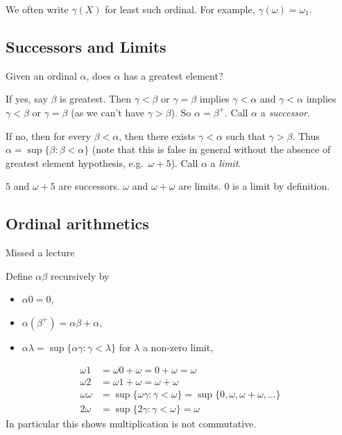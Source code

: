 \documentclass[a4paper]{article}
\begin{document}
\begin{notation}
  We often write \(\gamma(X)\) for least such ordinal. For example, \(\gamma(\omega) = \omega_1\).
\end{notation}

\subsection{Successors and Limits}

Given an ordinal \(\alpha\), does \(\alpha\) has a greatest element?

If yes, say \(\beta\) is greatest. Then \(\gamma < \beta\) or \(\gamma = \beta\) implies \(\gamma < \alpha\) and \(\gamma < \alpha\) implies \(\gamma < \beta\) or \(\gamma = \beta\) (as we can't have \(\gamma > \beta\)). So \(\alpha = \beta^+\). Call \(\alpha\) a \emph{successor}.

If no, then for every \(\beta < \alpha\), then there exists \(\gamma < \alpha\) such that \(\gamma > \beta\). Thus \(\alpha = \sup\{\beta: \beta < \alpha\}\) (note that this is false in general without the absence of greatest element hypothesis, e.g.\ \(\omega + 5\)). Call \(\alpha\) a \emph{limit}.

\begin{eg}
  \(5\) and \(\omega + 5\) are successors. \(\omega\) and \(\omega + \omega\) are limits. \(0\) is a limit by definition.
\end{eg}

\subsection{Ordinal arithmetics}

Missed a lecture

\begin{definition}
  Define \(\alpha\beta\) recursively by
  \begin{itemize}
  \item \(\alpha 0 = 0\),
  \item \(\alpha(\beta^+) = \alpha\beta + \alpha\),
  \item \(\alpha\lambda = \sup\{\alpha\gamma: \gamma < \lambda\}\) for \(\lambda\) a non-zero limit,
  \end{itemize}
\end{definition}

\begin{eg}
  \begin{align*}
    \omega 1 &= \omega 0 + \omega = 0 + \omega = \omega \\
    \omega 2 &= \omega 1 + \omega = \omega + \omega \\
    \omega\omega &= \sup \{\omega\gamma: \gamma < \omega\} = \sup \{0, \omega, \omega + \omega, \dots\} \\
    2 \omega &= \sup \{2\gamma: \gamma < \omega\} = \omega
  \end{align*}
  In particular this shows multiplication is not commutative.
\end{eg}
\end{document}
